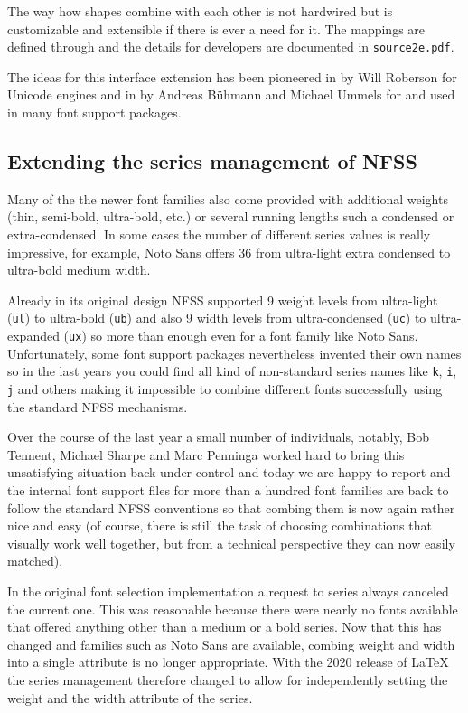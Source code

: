 \documentclass{ltnews}
\providecommand\pdfTeX{\hologo{pdfTeX}}
\begin{document}
The way how shapes combine with each other is not hardwired but is
customizable and extensible if there is ever a need for it. The
mappings are defined through  and the
details for developers are documented in \texttt{source2e.pdf}.

The ideas for this interface extension has been pioneered in
 by Will Roberson for Unicode engines and in
 by Andreas Bühmann and Michael Ummels for \pdfTeX{} and
used in many font support packages.



\subsection{Extending the series management of NFSS}

Many of the the newer font families also come provided with additional
weights (thin, semi-bold, ultra-bold, etc.\@) or several running lengths
such a condensed or extra-condensed. In some cases the number of
different series values is really impressive, for example, Noto Sans
offers 36 from ultra-light extra condensed to ultra-bold medium width.

Already in its original design NFSS supported 9 weight levels from
ultra-light (\texttt{ul}) to ultra-bold (\texttt{ub}) and also 9 width
levels from ultra-condensed (\texttt{uc}) to ultra-expanded
(\texttt{ux}) so more than enough even for a font family like Noto
Sans. Unfortunately, some font support packages nevertheless invented
their own names so in the last years you could find all kind of
non-standard series names like \texttt{k}, \texttt{i}, \texttt{j} and
others making it impossible to combine different fonts successfully
using the standard NFSS mechanisms.

Over the course of the last year a small number of individuals,
notably, Bob Tennent, Michael Sharpe and Marc Penninga worked hard to
bring this unsatisfying situation back under control and today we are
happy to report and the internal font support files for more than a
hundred font families are back to follow the standard NFSS conventions
so that combing them is now again rather nice and easy (of course,
there is still the task of choosing combinations that visually work
well together, but from a technical perspective they can now easily
matched).


In the original font selection implementation a request to series
always canceled the current one. This was reasonable because there
were nearly no fonts available that offered anything other than a
medium or a bold series. Now that this has changed and families such
as Noto Sans are available, combing weight and width into a single
attribute is no longer appropriate. With the 2020 release of \LaTeX{}
the series management therefore changed to allow for independently
setting the weight and the width attribute of the series.
\end{document}
